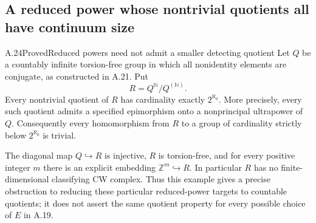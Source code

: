 \subsection{A reduced power whose nontrivial quotients all have continuum size}

\begin{claim}{A.24}{Proved}{Reduced powers need not admit a smaller detecting quotient}
Let $Q$ be a countably infinite torsion-free group in which all
nonidentity elements are conjugate, as constructed in A.21. Put
\[
 R=Q^{\mathbb N}/Q^{(\mathbb N)}.
 \tag{A.24.1}
\]
Every nontrivial quotient of $R$ has cardinality exactly
$2^{\aleph_0}$. More precisely, every such quotient admits a
specified epimorphism onto a nonprincipal ultrapower of $Q$.
Consequently every homomorphism from $R$ to a group of cardinality
strictly below $2^{\aleph_0}$ is trivial.

The diagonal map $Q\hookrightarrow R$ is injective, $R$ is
torsion-free, and for every positive integer $m$ there is an
explicit embedding $\mathbb Z^m\hookrightarrow R$. In particular
$R$ has no finite-dimensional classifying CW complex. Thus this
example gives a precise obstruction to reducing these particular
reduced-power targets to countable quotients; it does not assert
the same quotient property for every possible choice of $E$ in
A.19.
\end{claim}

